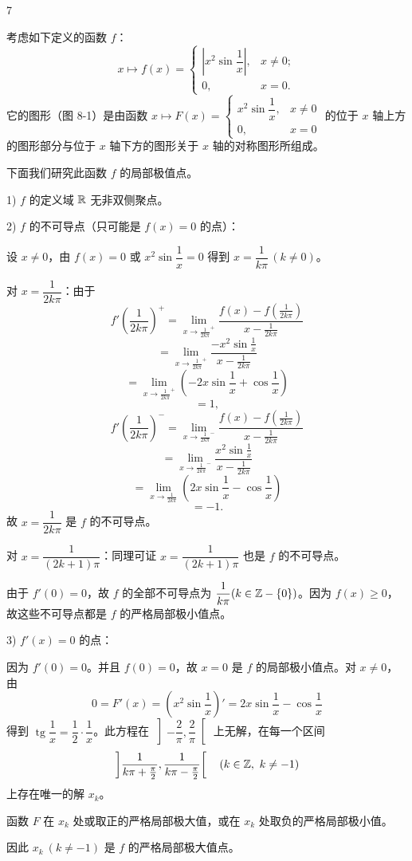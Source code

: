 \begin{sourceexample}{7}

考虑如下定义的函数 $f$：
\[x\longmapsto f(x)=\begin{cases} \left|x^2\sin\dfrac{1}{x}\right|, & x\neq0;\\[1ex] 0, & x=0. \end{cases}\]
它的图形（图 8-1）是由函数 $x\longmapsto F(x)=\begin{cases} x^2\sin\dfrac{1}{x}, & x\neq0\\[1ex] 0, & x=0 \end{cases}$ 的位于 $x$ 轴上方的图形部分与位于 $x$ 轴下方的图形关于 $x$ 轴的对称图形所组成。

下面我们研究此函数 $f$ 的局部极值点。

1) $f$ 的定义域 $\mathbb{R}$ 无非双侧聚点。

2) $f$ 的不可导点（只可能是 $f(x)=0$ 的点）：

设 $x\neq0$，由 $f(x)=0$ 或 $x^2\sin\dfrac{1}{x}=0$ 得到 $x=\dfrac{1}{k\pi}\,(k\neq0)$。

对 $x=\dfrac{1}{2k\pi}$：由于
\[f'\left(\frac{1}{2k\pi}\right)^{+}=\lim_{x\to\frac{1}{2k\pi}^{+}}\frac{f(x)-f\left(\frac{1}{2k\pi}\right)}{x-\frac{1}{2k\pi}}\]
\[=\lim_{x\to\frac{1}{2k\pi}^{+}}\frac{-x^2\sin\frac{1}{x}}{x-\frac{1}{2k\pi}}\]
\[=\lim_{x\to\frac{1}{2k\pi}^{+}}\left(-2x\sin\frac{1}{x}+\cos\frac{1}{x}\right)\]
\[=1,\]
\[f'\left(\frac{1}{2k\pi}\right)^{-}=\lim_{x\to\frac{1}{2k\pi}^{-}}\frac{f(x)-f\left(\frac{1}{2k\pi}\right)}{x-\frac{1}{2k\pi}}\]
\[=\lim_{x\to\frac{1}{2k\pi}^{-}}\frac{x^2\sin\frac{1}{x}}{x-\frac{1}{2k\pi}}\]
\[=\lim_{x\to\frac{1}{2k\pi}}\left(2x\sin\frac{1}{x}-\cos\frac{1}{x}\right)\]
\[=-1.\]
故 $x=\dfrac{1}{2k\pi}$ 是 $f$ 的不可导点。

对 $x=\dfrac{1}{(2k+1)\pi}$：同理可证 $x=\dfrac{1}{(2k+1)\pi}$ 也是 $f$ 的不可导点。

由于 $f'(0)=0$，故 $f$ 的全部不可导点为 $\dfrac{1}{k\pi}(k\in\mathbb{Z}-\{0\})$。因为 $f(x)\geqslant0$，故这些不可导点都是 $f$ 的严格局部极小值点。

3) $f'(x)=0$ 的点：

因为 $f'(0)=0$。并且 $f(0)=0$，故 $x=0$ 是 $f$ 的局部极小值点。对 $x\neq0$，由
\[0=F'(x)=\left(x^{2}\sin\frac{1}{x}\right)'=2x\sin\frac{1}{x}-\cos\frac{1}{x}\]
得到 $\operatorname{tg}\dfrac{1}{x}=\dfrac{1}{2}\cdot\dfrac{1}{x}$。此方程在 $\left]-\dfrac{2}{\pi},\dfrac{2}{\pi}\right[$ 上无解，在每一个区间
\[\left]\frac{1}{k\pi+\frac{\pi}{2}},\frac{1}{k\pi-\frac{\pi}{2}}\right[\quad(k\in\Z,\ k\neq-1)\]
上存在唯一的解 $x_k$。

函数 $F$ 在 $x_k$ 处或取正的严格局部极大值，或在 $x_k$ 处取负的严格局部极小值。

因此 $x_k\ (k\neq-1)$ 是 $f$ 的严格局部极大值点。

\end{sourceexample}

